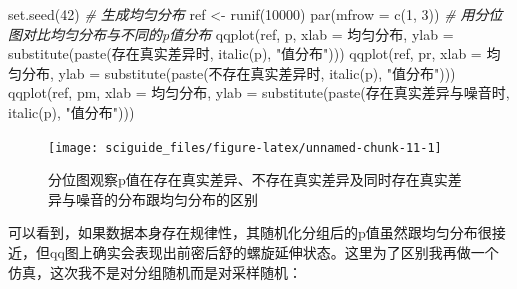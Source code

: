\documentclass[]{tufte-book}
\newenvironment{Shaded}{}{}
\newcommand{\AttributeTok}[1]{\textcolor[rgb]{0.49,0.56,0.16}{#1}}
\newcommand{\CommentTok}[1]{\textcolor[rgb]{0.38,0.63,0.69}{\textit{#1}}}
\newcommand{\DecValTok}[1]{\textcolor[rgb]{0.25,0.63,0.44}{#1}}
\newcommand{\FunctionTok}[1]{\textcolor[rgb]{0.02,0.16,0.49}{#1}}
\newcommand{\NormalTok}[1]{#1}
\newcommand{\OtherTok}[1]{\textcolor[rgb]{0.00,0.44,0.13}{#1}}
\newcommand{\StringTok}[1]{\textcolor[rgb]{0.25,0.44,0.63}{#1}}
\begin{document}
\begin{Shaded}
\begin{Highlighting}[]
\FunctionTok{set.seed}\NormalTok{(}\DecValTok{42}\NormalTok{)}
\CommentTok{\# 生成均匀分布}
\NormalTok{ref }\OtherTok{\textless{}{-}} \FunctionTok{runif}\NormalTok{(}\DecValTok{10000}\NormalTok{)}
\FunctionTok{par}\NormalTok{(}\AttributeTok{mfrow =} \FunctionTok{c}\NormalTok{(}\DecValTok{1}\NormalTok{, }\DecValTok{3}\NormalTok{))}
\CommentTok{\# 用分位图对比均匀分布与不同的p值分布}
\FunctionTok{qqplot}\NormalTok{(ref, p, }\AttributeTok{xlab =} \StringTok{\textquotesingle{}均匀分布\textquotesingle{}}\NormalTok{, }\AttributeTok{ylab =} \FunctionTok{substitute}\NormalTok{(}\FunctionTok{paste}\NormalTok{(}\StringTok{\textquotesingle{}存在真实差异时\textquotesingle{}}\NormalTok{, }\FunctionTok{italic}\NormalTok{(}\StringTok{\textquotesingle{}p\textquotesingle{}}\NormalTok{), }\StringTok{"值分布"}\NormalTok{)))}
\FunctionTok{qqplot}\NormalTok{(ref, pr, }\AttributeTok{xlab =} \StringTok{\textquotesingle{}均匀分布\textquotesingle{}}\NormalTok{, }\AttributeTok{ylab =} \FunctionTok{substitute}\NormalTok{(}\FunctionTok{paste}\NormalTok{(}\StringTok{\textquotesingle{}不存在真实差异时\textquotesingle{}}\NormalTok{, }\FunctionTok{italic}\NormalTok{(}\StringTok{\textquotesingle{}p\textquotesingle{}}\NormalTok{), }\StringTok{"值分布"}\NormalTok{)))}
\FunctionTok{qqplot}\NormalTok{(ref, pm, }\AttributeTok{xlab =} \StringTok{\textquotesingle{}均匀分布\textquotesingle{}}\NormalTok{, }\AttributeTok{ylab =} \FunctionTok{substitute}\NormalTok{(}\FunctionTok{paste}\NormalTok{(}\StringTok{\textquotesingle{}存在真实差异与噪音时\textquotesingle{}}\NormalTok{, }\FunctionTok{italic}\NormalTok{(}\StringTok{\textquotesingle{}p\textquotesingle{}}\NormalTok{), }\StringTok{"值分布"}\NormalTok{)))}
\end{Highlighting}
\end{Shaded}

\begin{figure}
\texttt{[image: sciguide\_files/figure-latex/unnamed-chunk-11-1]} \caption[分位图观察p值在存在真实差异、不存在真实差异及同时存在真实差异与噪音的分布跟均匀分布的区别]{分位图观察p值在存在真实差异、不存在真实差异及同时存在真实差异与噪音的分布跟均匀分布的区别}\label{fig:unnamed-chunk-11}
\end{figure}

可以看到，如果数据本身存在规律性，其随机化分组后的p值虽然跟均匀分布很接近，但qq图上确实会表现出前密后舒的螺旋延伸状态。这里为了区别我再做一个仿真，这次我不是对分组随机而是对采样随机：
\end{document}
